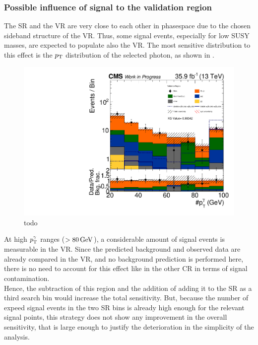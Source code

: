\subsubsection*{Possible influence of signal to the validation region}
The SR and the VR are very close to each other in phasespace due to the chosen sideband structure of the VR. Thus, some signal events, especially for low SUSY masses, are expected to populate also the VR. The most sensitive distribution to this effect is the $p_{\mathrm{T}}$ distribution of the selected photon, as shown in .
\begin{figure}[tbp]
 \centering
 \includegraphics[width=\pairwidth]{figures/VR_signal_study/VR_LL_pt_g1_log}
 \caption{todo}
 \label{fig:signalContVR}
\end{figure}
At high $p_{\mathrm{T}}^{\gamma}$ ranges ($>80\,\text{Ge\hspace{-.08em}V}$), a considerable amount of signal events is measurable in the VR. Since the predicted background and observed data are already compared in the VR, and no background prediction is performed here, there is no need to account for this effect like in the other CR in terms of signal contamination.\\
Hence, the subtraction of this region and the addition of adding it to the SR as a third search bin would increase the total sensitivity. But, because the number of expeed signal events in the two SR bins is  already high enough for the relevant signal points, this strategy does not show any improvement in the overall sensitivity, that is large enough to justify the deterioration in the simplicity of the analysis.

